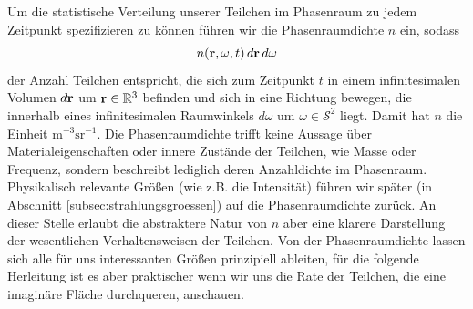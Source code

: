	Um die statistische Verteilung unserer Teilchen im Phasenraum zu jedem Zeitpunkt spezifizieren zu können führen wir die Phasenraumdichte $n$ ein, sodass $$n(\mathbf{r},\omega,t)\,d\mathbf{r}\,d\omega$$ der Anzahl Teilchen entspricht, die sich zum Zeitpunkt $t$ in einem infinitesimalen Volumen $d\mathbf{r}$ um $\mathbf{r} \in \mathbb{R}^3$ befinden und sich in eine Richtung bewegen, die innerhalb eines infinitesimalen Raumwinkels $d\omega$ um $\omega \in \mathcal{S}^2$ liegt. Damit hat $n$ die Einheit $\text{m}^{-3}\text{sr}^{-1}$. Die Phasenraumdichte trifft keine Aussage über Materialeigenschaften oder innere Zustände der Teilchen, wie Masse oder Frequenz, sondern beschreibt lediglich deren Anzahldichte im Phasenraum. Physikalisch relevante Größen (wie z.B. die Intensität) führen wir später (in Abschnitt \ref{subsec:strahlungsgroessen}) auf die Phasenraumdichte zurück. An dieser Stelle erlaubt die abstraktere Natur von $n$ aber eine klarere Darstellung der wesentlichen Verhaltensweisen der Teilchen. Von der Phasenraumdichte lassen sich alle für uns interessanten Größen prinzipiell ableiten, für die folgende Herleitung ist es aber praktischer wenn wir uns die Rate der Teilchen, die eine imaginäre Fläche durchqueren, anschauen.
	
